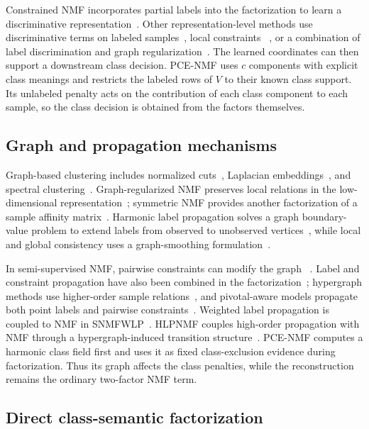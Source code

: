 \documentclass[preprint,12pt]{elsarticle}
\theoremstyle{remark}
\begin{document}
Constrained NMF incorporates partial labels into the factorization to
learn a discriminative representation~\cite{liu2012cnmf}. Other
representation-level methods use discriminative terms on labeled
samples~\cite{xing2021dssnmf,li2025ednmf}, local constraints
~\cite{shen2026lcnmf}, or a combination of label discrimination and
graph regularization~\cite{xing2021gnmfld}. The learned coordinates
can then support a downstream class decision. PCE-NMF uses
$c$ components with explicit class meanings and restricts the labeled
rows of $V$ to their known class support. Its unlabeled penalty acts on
the contribution of each class component to each sample, so the class
decision is obtained from the factors themselves.

\subsection{Graph and propagation mechanisms}

Graph-based clustering includes normalized cuts~\cite{shi2000ncut},
Laplacian embeddings~\cite{belkin2003laplacian}, and spectral
clustering~\cite{luxburg2007tutorial}. Graph-regularized NMF
preserves local relations in the low-dimensional
representation~\cite{cai2011gnmf}; symmetric NMF provides another
factorization of a sample affinity matrix~\cite{kuang2012symmetric}.
Harmonic label propagation solves a graph boundary-value problem to
extend labels from observed to unobserved vertices~\cite{zhu2003harmonic},
while local and global consistency uses a graph-smoothing
formulation~\cite{zhou2003consistency}.

In semi-supervised NMF, pairwise constraints can modify the graph
~\cite{wang2016constraint}. Label and constraint propagation have also
been combined in the factorization~\cite{mo2024propagation}; hypergraph
methods use higher-order sample relations~\cite{yin2023hypergraph},
and pivotal-aware models propagate both point labels and pairwise
constraints~\cite{yang2025pivotal}. Weighted label propagation is
coupled to NMF in SNMFWLP~\cite{jing2026snmfwlp}. HLPNMF couples
high-order propagation with NMF through a hypergraph-induced
transition structure~\cite{li2026hlpnmf}. PCE-NMF computes a harmonic class field
first and uses it as fixed class-exclusion evidence during
factorization. Thus its graph affects the class penalties, while the
reconstruction remains the ordinary two-factor NMF term.

\subsection{Direct class-semantic factorization}
\end{document}
